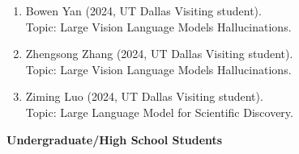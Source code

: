 \begin{enumerate}[label={},leftmargin=15pt]
\vspace{1mm} 
\item Bowen Yan (2024, UT Dallas Visiting student). \\
Topic: Large Vision Language Models Hallucinations.

\vspace{1mm}
\item Zhengsong Zhang (2024, UT Dallas Visiting student). \\
Topic: Large Vision Language Models Hallucinations.

\vspace{1mm}
\item Ziming Luo (2024, UT Dallas Visiting student). \\
Topic: Large Language Model for Scientific Discovery.


\end{enumerate}


\noindent \textbf{Undergraduate/High School Students}

